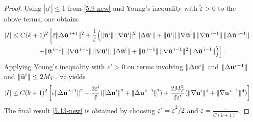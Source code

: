 \documentclass{article}
\theoremstyle{definition}                   %
\begin{document}
\begin{proof}
\medskip

\noindent Using $|\eta^i|\le 1$ from \eqref{5.9-new} and  Young's inequality with $\tilde{\varepsilon}>0$ to the above terms, one obtains
\begin{align}
|I| & \le C (k+1)^2 \left[ \tilde\varepsilon\|\Delta\tilde {\bf u}^{\,i+1}\|^{2} 
 + \frac{1}{\tilde\varepsilon}\Big(
\|\bar {\bf u}^{i}\|\,\|\nabla\bar {\bf u}^{i}\|^{2}\,\|\Delta\bar {\bf u}^{i}\|
+ \|\bar {\bf u}^{i}\|\,\|\nabla\bar {\bf u}^{i}\|\,\|\nabla\bar {\bf u}^{\,i-1}\|\,\|\Delta\bar {\bf u}^{\,i-1}\|
\right.
\notag
\\
& \left. \qquad\qquad
+ \|\bar {\bf u}^{\,i-1}\|\,\|\nabla\bar {\bf u}^{\,i-1}\|\,\|\nabla\bar {\bf u}^{i}\|\,\|\Delta\bar {\bf u}^{i}\|
+ \|\bar {\bf u}^{\,i-1}\|\,\|\nabla\bar {\bf u}^{\,i-1}\|^{2}\,\|\Delta\bar {\bf u}^{\,i-1}\|
\Big) \right].
\end{align}
Applying Young's inequality with $\varepsilon'>0$ on terms involving 
$\|\Delta\bar {\bf u}^{i}\|$ and $\|\Delta\bar {\bf u}^{i-1}\|$ 
and $\|\bar {\bf u}^i\|\le 2M_T$, $\forall i$ yields
\begin{align}
|I| \le 
C(k+1)^2 \left[ 
\tilde\varepsilon \|\Delta\tilde {\bf u}^{\,i+1}\|^2
+ \frac{2\varepsilon'}{\tilde{\varepsilon}}
 ( \|\Delta\bar {\bf u}^{i}\|^2 + 
   \|\Delta\bar {\bf u}^{\,i-1}\|^2 )
+ \frac{2M_T^2}{\tilde{\varepsilon} \varepsilon'}
  ( \|\nabla\bar {\bf u}^i\|^4 +
   \|\nabla\bar {\bf u}^{\,i-1}\|^4)
   \right]
\end{align}
The final result \eqref{5.13-new} is obtained by choosing $\varepsilon'=\tilde{\varepsilon}^2/2$ and
$\tilde{\varepsilon}=\frac{\varepsilon}{C(k+1)^2}$.
\end{proof}
\end{document}
